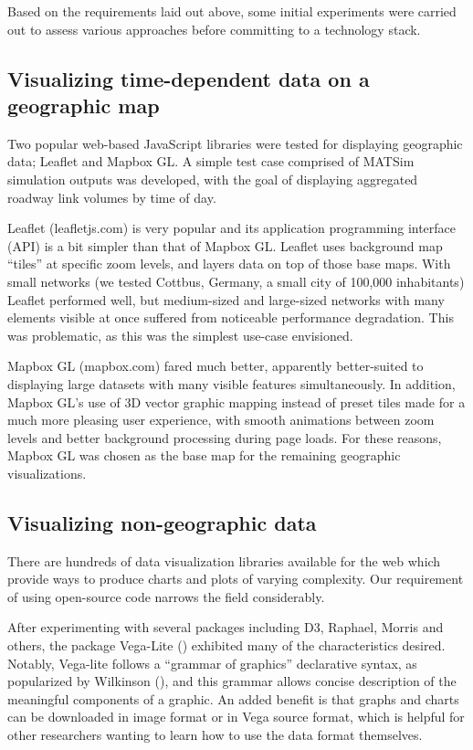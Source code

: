 Based on the requirements laid out above, some initial experiments were carried out to assess various approaches before committing to a technology stack.

\hypertarget{mathub-visualizing-time-dependent-data-on-a-geographic-map}{%
\subsection{Visualizing time-dependent data on a geographic
map}\label{visualizing-time-dependent-data-on-a-geographic-map}}

Two popular web-based JavaScript libraries were tested for displaying geographic data; Leaflet and Mapbox GL. A simple test case comprised of MATSim simulation outputs was developed, with the goal of displaying aggregated roadway link volumes by time of day.

Leaflet (leafletjs.com) is very popular and its application programming interface (API) is a bit simpler than that of Mapbox GL. Leaflet uses background map ``tiles'' at specific zoom levels, and layers data on top of those base maps. With small networks (we tested Cottbus, Germany, a small city of 100,000 inhabitants) Leaflet performed well, but medium-sized and large-sized networks with many elements visible at once suffered from noticeable performance degradation. This was problematic, as this was the simplest use-case envisioned.

Mapbox GL (mapbox.com) fared much better, apparently better-suited to displaying large datasets with many visible features simultaneously. In addition, Mapbox GL's use of 3D vector graphic mapping instead of preset tiles made for a much more pleasing user experience, with smooth animations between zoom levels and better background processing during page loads. For these reasons, Mapbox GL was chosen as the base map for the remaining geographic visualizations.

\hypertarget{visualizing-non-geographic-data}{%
\subsection{Visualizing non-geographic data}\label{visualizing-non-geographic-data}}

There are hundreds of data visualization libraries available for the web which provide ways to produce charts and plots of varying complexity. Our requirement of using open-source code narrows the field considerably.

After experimenting with several packages including D3, Raphael, Morris and others, the package Vega-Lite (\cite{Satyanarayan2016vega}) exhibited many of the characteristics desired. Notably, Vega-lite follows a ``grammar of graphics'' declarative syntax, as popularized by Wilkinson (\cite{Wilkinson2012grammar}), and this grammar allows concise description of the meaningful components of a graphic. An added benefit is that graphs and charts can be downloaded in image format or in Vega source format, which is helpful for other researchers wanting to learn how to use the data format themselves.

